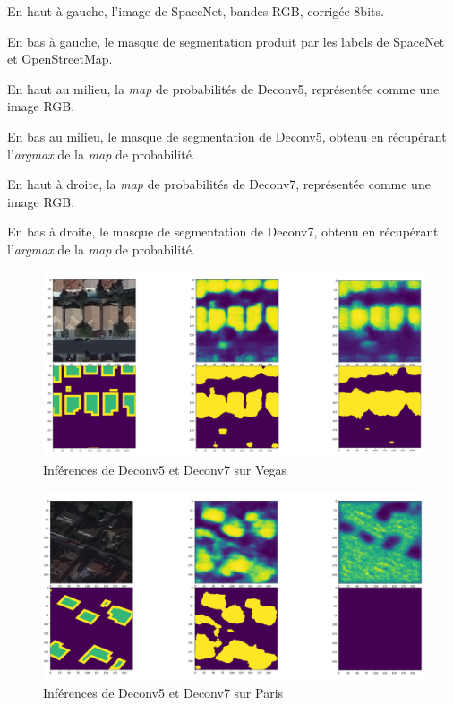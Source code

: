 \documentclass[a4paper, 11pt]{report}
\begin{document}
En haut à gauche, l'image de SpaceNet, bandes RGB, corrigée 8bits.

En bas à gauche, le masque de segmentation produit par les labels de SpaceNet et OpenStreetMap.

En haut au milieu, la \emph{map} de probabilités de Deconv5, représentée comme une image RGB.

En bas au milieu, le masque de segmentation de Deconv5, obtenu en récupérant l'\emph{argmax} de la \emph{map} de probabilité.

En haut à droite, la \emph{map} de probabilités de Deconv7, représentée comme une image RGB.

En bas à droite, le masque de segmentation de Deconv7, obtenu en récupérant l'\emph{argmax} de la \emph{map} de probabilité.

\begin{figure}[H]
	\begin{center}
		\includegraphics[scale=0.225]{Images/Deconvs_Vegas.png}
		\caption{Inférences de Deconv5 et Deconv7 sur Vegas}
	\end{center}
\end{figure}

\begin{figure}[H]
	\begin{center}
		\includegraphics[scale=0.225]{Images/Deconvs_Paris.png}
		\caption{Inférences de Deconv5 et Deconv7 sur Paris}
	\end{center}
\end{figure}
\end{document}
